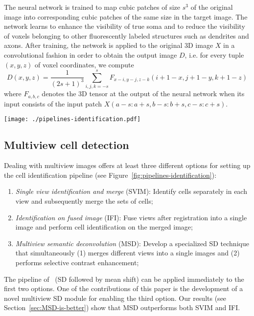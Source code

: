 \documentclass[smallextended]{svjour3}       %
\begin{document}
The neural network is trained to map cubic patches of size $s^3$ of
the original image into corresponding cubic patches of the same size
in the target image. The network learns to enhance the visibility of
true soma and to reduce the visibility of voxels belonging to other fluorescently labeled
structures such as dendrites and axons. After training, the network is applied to the original 3D
image $X$ in a convolutional fashion in order to obtain the output
image $D$, i.e. for every tuple $(x,y,z)$ of voxel coordinates, we compute
\begin{equation}
  \label{eq:semantic}
  D(x,y,z) = \frac{1}{(2s+1)^3}
  \sum_{i,j,k=-s}^s%
  F_{x-i,y-j,z-k}(i+1-x,j+1-y,k+1-z)
\end{equation}
where $F_{a,b,c}$ denotes the 3D tensor at the output of the neural
network when its input consists of the input patch
$X(a-s:a+s,b-s:b+s,c-s:c+s)$.

\begin{figure*}
  \centering
  \texttt{[image: ./pipelines-identification.pdf]}
  \caption{Three alternative options for multiview cell detection}
  \label{fig:pipelines-identification}
\end{figure*}


\subsection{Multiview cell detection}
\label{sec:multiview-semantic}
Dealing with multiview images offers at least three different options
for setting up the cell identification pipeline (see
Figure~\ref{fig:pipelines-identification}):
\begin{enumerate}
\item \textit{Single view identification and merge} (SVIM): Identify
  cells separately in each view and subsequently merge the sets of
  cells;
\item \textit{Identification on fused image} (IFI): Fuse views after
  registration into a single image and perform cell identification on
  the merged image;
\item \textit{Multiview semantic deconvolution} (MSD): Develop a
  specialized SD technique that simultaneously (1)
  merges different views into a single images and (2) performs
  selective contrast enhancement;
\end{enumerate}
The pipeline of~\cite{frasconi_large-scale_2014} (SD followed by
mean shift) can be applied immediately to the first two options. One
of the contributions of this paper is the development of a novel
multiview SD module for enabling the third
option. Our results (see Section~\ref{sec:MSD-is-better}) show that
MSD outperforms both SVIM and IFI.
\end{document}
